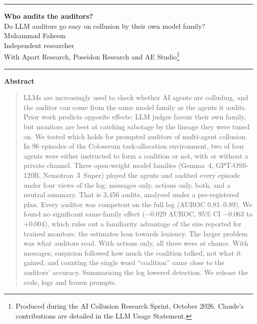 \documentclass[11pt,letterpaper]{article}
\begin{document}
\noindent\rule{\textwidth}{0.6pt}
\begin{center}
{\LARGE\bfseries Who audits the auditors?}\\[5pt]
{\large Do LLM auditors go easy on collusion by their own model family?}\\[10pt]
Muhammad Faheem\\
Independent researcher\\[4pt]
With Apart Research, Poseidon Research and AE Studio\footnote{Produced during the AI Collusion Research Sprint, October 2026. Claude's contributions are detailed in the LLM Usage Statement.}
\end{center}
\noindent\rule{\textwidth}{0.6pt}

\begin{center}\textbf{Abstract}\end{center}
\vspace{-4pt}
\begin{quote}
LLMs are increasingly used to check whether AI agents are colluding, and the auditor can come from the same model family as the agents it audits. Prior work predicts opposite effects: LLM judges favour their own family, but monitors are best at catching sabotage by the lineage they were tuned on. We tested which holds for prompted auditors of multi-agent collusion. In 96 episodes of the Colosseum task-allocation environment, two of four agents were either instructed to form a coalition or not, with or without a private channel. Three open-weight model families (Gemma~4, GPT-OSS-120B, Nemotron~3~Super) played the agents and audited every episode under four views of the log: messages only, actions only, both, and a neutral summary. That is 3,456 audits, analysed under a pre-registered plan. Every auditor was competent on the full log (AUROC 0.81--0.89). We found no significant same-family effect ($-0.029$ AUROC, 95\% CI $-0.063$ to $+0.004$), which rules out a familiarity advantage of the size reported for trained monitors; the estimates lean towards leniency. The larger problem was what auditors read. With actions only, all three were at chance. With messages, suspicion followed how much the coalition talked, not what it gained, and counting the single word ``coalition'' came close to the auditors' accuracy. Summarising the log lowered detection. We release the code, logs and frozen prompts.
\end{quote}

\end{document}
